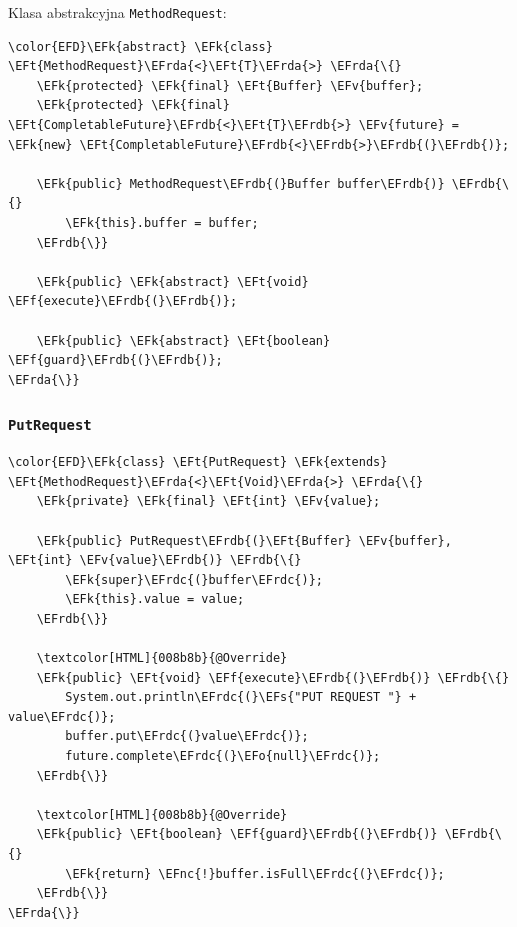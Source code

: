 \documentclass[11pt]{article}
\newcommand{\EFs}[1]{\textcolor{EFs}{#1}} %
\newcommand{\EFk}[1]{\textcolor{EFk}{#1}} %
\newcommand{\EFf}[1]{\textcolor{EFf}{#1}} %
\newcommand{\EFv}[1]{\textcolor{EFv}{#1}} %
\newcommand{\EFt}[1]{\textcolor{EFt}{#1}} %
\newcommand{\EFo}[1]{\textcolor{EFo}{#1}} %
\newcommand{\EFnc}[1]{#1} %
\newcommand{\EFrda}[1]{\textcolor{EFrda}{#1}} %
\newcommand{\EFrdb}[1]{\textcolor{EFrdb}{#1}} %
\newcommand{\EFrdc}[1]{\textcolor{EFrdc}{#1}} %
\begin{document}
Klasa abstrakcyjna \texttt{MethodRequest}:
\begin{Code}
\begin{Verbatim}
\color{EFD}\EFk{abstract} \EFk{class} \EFt{MethodRequest}\EFrda{<}\EFt{T}\EFrda{>} \EFrda{\{}
    \EFk{protected} \EFk{final} \EFt{Buffer} \EFv{buffer};
    \EFk{protected} \EFk{final} \EFt{CompletableFuture}\EFrdb{<}\EFt{T}\EFrdb{>} \EFv{future} = \EFk{new} \EFt{CompletableFuture}\EFrdb{<}\EFrdb{>}\EFrdb{(}\EFrdb{)};

    \EFk{public} MethodRequest\EFrdb{(}Buffer buffer\EFrdb{)} \EFrdb{\{}
        \EFk{this}.buffer = buffer;
    \EFrdb{\}}

    \EFk{public} \EFk{abstract} \EFt{void} \EFf{execute}\EFrdb{(}\EFrdb{)};

    \EFk{public} \EFk{abstract} \EFt{boolean} \EFf{guard}\EFrdb{(}\EFrdb{)};
\EFrda{\}}
\end{Verbatim}
\end{Code}
\subsubsection*{\texttt{PutRequest}}
\label{sec:orgfa2afb8}
\begin{Code}
\begin{Verbatim}
\color{EFD}\EFk{class} \EFt{PutRequest} \EFk{extends} \EFt{MethodRequest}\EFrda{<}\EFt{Void}\EFrda{>} \EFrda{\{}
    \EFk{private} \EFk{final} \EFt{int} \EFv{value};

    \EFk{public} PutRequest\EFrdb{(}\EFt{Buffer} \EFv{buffer}, \EFt{int} \EFv{value}\EFrdb{)} \EFrdb{\{}
        \EFk{super}\EFrdc{(}buffer\EFrdc{)};
        \EFk{this}.value = value;
    \EFrdb{\}}

    \textcolor[HTML]{008b8b}{@Override}
    \EFk{public} \EFt{void} \EFf{execute}\EFrdb{(}\EFrdb{)} \EFrdb{\{}
        System.out.println\EFrdc{(}\EFs{"PUT REQUEST "} + value\EFrdc{)};
        buffer.put\EFrdc{(}value\EFrdc{)};
        future.complete\EFrdc{(}\EFo{null}\EFrdc{)};
    \EFrdb{\}}

    \textcolor[HTML]{008b8b}{@Override}
    \EFk{public} \EFt{boolean} \EFf{guard}\EFrdb{(}\EFrdb{)} \EFrdb{\{}
        \EFk{return} \EFnc{!}buffer.isFull\EFrdc{(}\EFrdc{)};
    \EFrdb{\}}
\EFrda{\}}
\end{Verbatim}
\end{Code}
\end{document}
